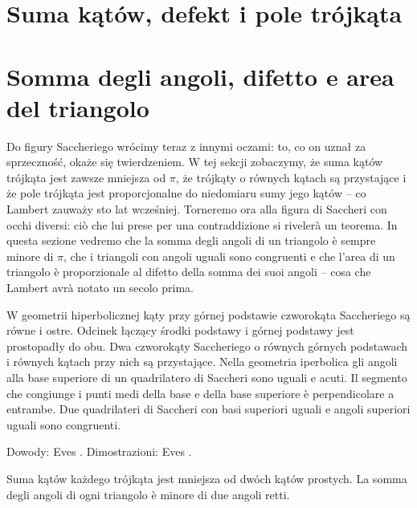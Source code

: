 
\section{Suma kątów, defekt i pole trójkąta} %
\section{Somma degli angoli, difetto e area del triangolo} %
\label{sekcja_suma_katow}

Do figury Saccheriego wrócimy teraz z innymi oczami: to, co on uznał za sprzeczność, okaże się twierdzeniem. %
W tej sekcji zobaczymy, że suma kątów trójkąta jest zawsze mniejsza od $\pi$, że trójkąty o równych kątach są przystające i że pole trójkąta jest proporcjonalne do niedomiaru sumy jego kątów -- co Lambert zauważy sto lat wcześniej. %
Torneremo ora alla figura di Saccheri con occhi diversi: ciò che lui prese per una contraddizione si rivelerà un teorema. %
In questa sezione vedremo che la somma degli angoli di un triangolo è sempre minore di $\pi$, che i triangoli con angoli uguali sono congruenti e che l'area di un triangolo è proporzionale al difetto della somma dei suoi angoli -- cosa che Lambert avrà notato un secolo prima. %

\begin{proposition}
	W geometrii hiperbolicznej kąty przy górnej podstawie czworokąta Saccheriego są równe i ostre. %
	Odcinek łączący środki podstawy i górnej podstawy jest prostopadły do obu. %
	Dwa czworokąty Saccheriego o równych górnych podstawach i równych kątach przy nich są przystające. %
	Nella geometria iperbolica gli angoli alla base superiore di un quadrilatero di Saccheri sono uguali e acuti. %
	Il segmento che congiunge i punti medi della base e della base superiore è perpendicolare a entrambe. %
	Due quadrilateri di Saccheri con basi superiori uguali e angoli superiori uguali sono congruenti. %
\end{proposition}

Dowody: Eves \cite[s. 298--299]{eves1_1972}. %
Dimostrazioni: Eves \cite[p. 298--299]{eves1_1972}. %

\begin{theorem}
	Suma kątów każdego trójkąta jest mniejsza od dwóch kątów prostych. %
	La somma degli angoli di ogni triangolo è minore di due angoli retti. %
\end{theorem}

